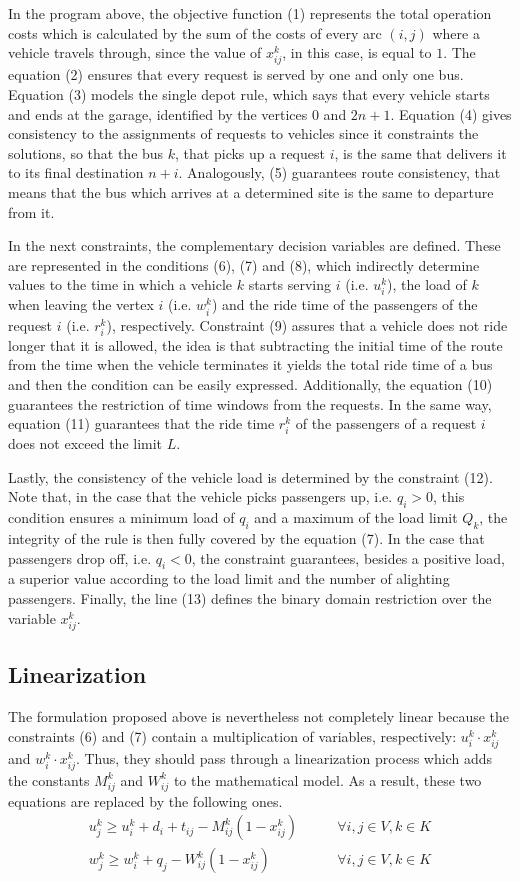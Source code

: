 \documentclass[tuberlin,cic,tc,openright,english,noabntcite,oneside]{iiufrgs}
\begin{document}
In the program above, the objective function (1) represents the total operation costs which is calculated by the sum of the costs of every arc $(i,j)$ where a vehicle travels through, since the value of $x_{ij}^k$, in this case, is equal to $1$. The equation (2) ensures that every request is served by one and only one bus. Equation (3) models the single depot rule, which says that every vehicle starts and ends at the garage, identified by the vertices $0$ and $2n+1$. Equation (4) gives consistency to the assignments of requests to vehicles since it constraints the solutions, so that the bus $k$, that picks up a request $i$, is the same that delivers it to its final destination $n+i$. Analogously, (5) guarantees route consistency, that means that the bus which arrives at a determined site is the same to departure from it.

In the next constraints, the complementary decision variables are defined. These are represented in the conditions (6), (7) and (8), which indirectly determine values to the time in which a vehicle $k$ starts serving $i$ (i.e. $u_i^k$), the load of $k$ when leaving the vertex $i$ (i.e. $w_i^k$) and the ride time of the passengers of the request $i$ (i.e. $r_i^k$), respectively. Constraint (9) assures that a vehicle does not ride longer that it is allowed, the idea is that subtracting the initial time of the route from the time when the vehicle terminates it yields the total ride time of a bus and then the condition can be easily expressed. Additionally, the equation (10) guarantees the restriction of time windows from the requests. In the same way, equation (11) guarantees that the ride time $r_i^k$ of the passengers of a request $i$ does not exceed the limit $L$.

Lastly, the consistency of the vehicle load is determined by the constraint (12). Note that, in the case that the vehicle picks passengers up, i.e. $q_i > 0$, this condition ensures a minimum load of $q_i$ and a maximum of the load limit $Q_k$, the integrity of the rule is then fully covered by the equation (7). In the case that passengers drop off, i.e. $q_i < 0$, the constraint guarantees, besides a positive load, a superior value according to the load limit and the number of alighting passengers. Finally, the line (13) defines the binary domain restriction over the variable $x_{ij}^k$.

\subsection{Linearization}
The formulation proposed above is nevertheless not completely linear because the constraints (6) and (7) contain a multiplication of variables, respectively: $u_i^k \cdot x_{ij}^k$ and $w_i^k \cdot x_{ij}^k$. Thus, they should pass through a linearization process which adds the constants $M_{ij}^k$ and $W_{ij}^k$ to the mathematical model. As a result, these two equations are replaced by the following ones.
\begin{align}
	u_j^k \geq u_i^k + d_i + t_{ij} - M_{ij}^k(1 - x_{ij}^k)	\qquad & \forall i,j \in V, k \in K \\
	w_j^k \geq w_i^k + q_j - W_{ij}^k(1 - x_{ij}^k)				\qquad & \forall i,j \in V, k \in K
\end{align}
\end{document}
